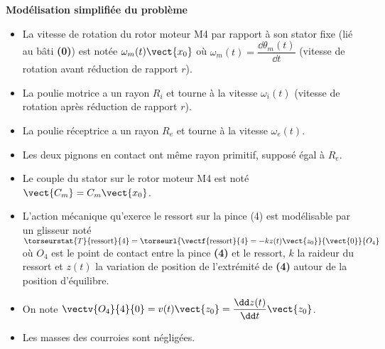 
\textbf{Modélisation simplifiée du problème}
\begin{itemize}
\item La vitesse de rotation du rotor moteur M4 par rapport à son stator fixe (lié au bâti \textbf{(0)}) est notée $\omega_m(t)\vect{x_0}$  où $\omega_m(t)=\dfrac{\dd \theta_m(t)}{\dd t}$  (vitesse de rotation avant réduction de rapport $r$).
\item La poulie motrice a un rayon $R_i$ et tourne à la vitesse $\omega_i(t)$ (vitesse de rotation après réduction de rapport $r$).
\item La poulie réceptrice a un rayon $R_e$ et tourne à la vitesse $\omega_e(t)$.
\item Les deux pignons en contact ont même rayon primitif, supposé égal à $R_e$.
\item Le couple du stator sur le rotor moteur M4 est noté  $\vect{C_m}=C_m \vect{x_0}$.
\item L’action mécanique qu’exerce le ressort sur la pince (4) est modélisable par un glisseur noté 
$\torseurstat{T}{\text{ressort}}{4}=\torseurl{\vectf{\text{ressort}}{4}=-kz(t)\vect{z_0}}{\vect{0}}{O_4}$ où $O_4$ est le point de contact entre la pince \textbf{(4)} et le ressort, $k$ la raideur du ressort et $z(t)$ la variation de position de l’extrémité de \textbf{(4)} autour de la position d’équilibre.
\item On note $\vectv{O_4}{4}{0}=v(t)\vect{z_0}=\dfrac{\dd z(t)}{\dd t}\vect{z_0}$.
\item Les masses des courroies sont négligées.
\end{itemize}


